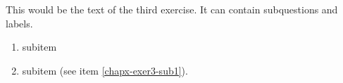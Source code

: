 This would be the text of the third exercise. It can contain subquestions and labels. 
\begin{enumerate}
\item{subitem\label{chapx-exer3-sub1}}
\item{subitem (see item \ref{chapx-exer3-sub1}).\label{chapx-exer3-sub2}}
\end{enumerate}